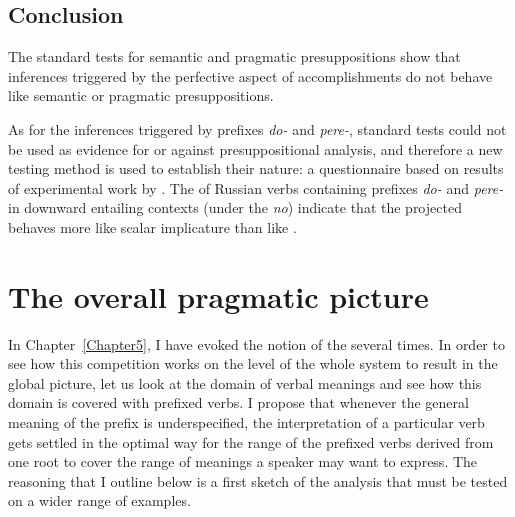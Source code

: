 \subsection{Conclusion}
The standard tests for semantic and pragmatic presuppositions show that inferences triggered by the perfective aspect of accomplishments do not behave like semantic or pragmatic presuppositions.

As for the inferences triggered by prefixes \textit{do-} and \textit{pere-}, standard tests could not be used as evidence for or against presuppositional analysis, and therefore a new testing method is used to establish their nature: a questionnaire based on results of experimental work by \citet{Chemla:09}.
The  of Russian verbs containing prefixes \textit{do-} and \textit{pere-} in downward entailing contexts (under the  \textit{no}) indicate that the projected  behaves more like scalar implicature than like .


\section{The overall pragmatic picture}\label{section:pragm:overall}
In Chapter~\ref{Chapter5}, I have evoked the notion of the  several times. In order to see how this competition works on the level of the whole  system to result in the global picture, let us look at the domain of verbal meanings and see how this domain is covered with prefixed verbs. I propose that whenever the general meaning of the prefix is underspecified, the interpretation of a particular verb gets settled in the optimal way for the range of the prefixed verbs derived from one root to cover the range of meanings a speaker may want to express. The reasoning that I outline below is a first sketch of the analysis that must be tested on a wider range of examples.

